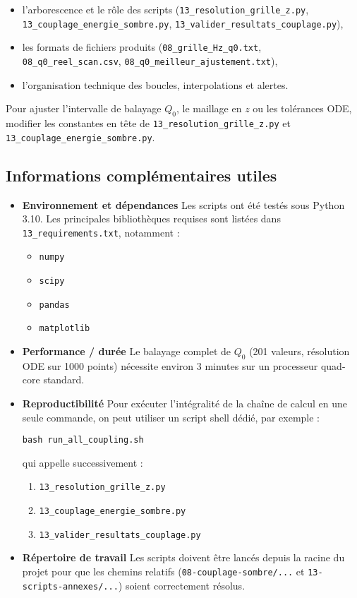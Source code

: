 \begin{itemize}
  \item l’arborescence et le rôle des scripts (\texttt{13\_resolution\_grille\_z.py}, \texttt{13\_couplage\_energie\_sombre.py}, \texttt{13\_valider\_resultats\_couplage.py}),
  \item les formats de fichiers produits (\texttt{08\_grille\_Hz\_q0.txt}, \texttt{08\_q0\_reel\_scan.csv}, \texttt{08\_q0\_meilleur\_ajustement.txt}),
  \item l’organisation technique des boucles, interpolations et alertes.
\end{itemize}

Pour ajuster l’intervalle de balayage \(Q_{0}\), le maillage en \(z\) ou les tolérances ODE, modifier les constantes en tête de \texttt{13\_resolution\_grille\_z.py} et \texttt{13\_couplage\_energie\_sombre.py}.

\subsection{Informations complémentaires utiles}

\begin{itemize}
  \item \textbf{Environnement et dépendances}
    Les scripts ont été testés sous Python 3.10.
    Les principales bibliothèques requises sont listées dans \texttt{13\_requirements.txt}, notamment :
    \begin{itemize}
      \item \texttt{numpy}
      \item \texttt{scipy}
      \item \texttt{pandas}
      \item \texttt{matplotlib}
    \end{itemize}

  \item \textbf{Performance / durée}
    Le balayage complet de \(Q_{0}\) (201 valeurs, résolution ODE sur 1000 points)
    nécessite environ 3 minutes sur un processeur quad-core standard.

  \item \textbf{Reproductibilité}
    Pour exécuter l’intégralité de la chaîne de calcul en une seule commande, on peut utiliser un script shell dédié, par exemple :
    \begin{verbatim}
bash run_all_coupling.sh
    \end{verbatim}
    qui appelle successivement :
    \begin{enumerate}
      \item \texttt{13\_resolution\_grille\_z.py}
      \item \texttt{13\_couplage\_energie\_sombre.py}
      \item \texttt{13\_valider\_resultats\_couplage.py}
    \end{enumerate}

  \item \textbf{Répertoire de travail}
    Les scripts doivent être lancés depuis la racine du projet pour que les chemins relatifs
    (\texttt{08-couplage-sombre/...} et \texttt{13-scripts-annexes/...}) soient correctement résolus.
\end{itemize}

